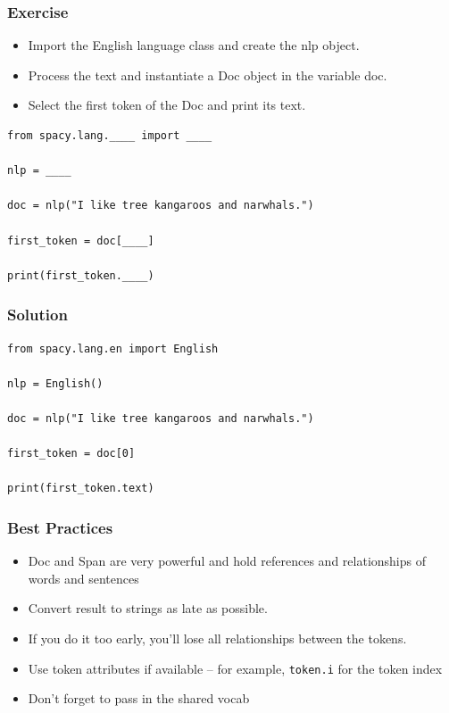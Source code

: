 \begin{frame}[fragile]\frametitle{Exercise}

  \begin{itemize}
    \item Import the English language class and create the nlp object.
    \item Process the text and instantiate a Doc object in the variable doc.
    \item Select the first token of the Doc and print its text.
  \end{itemize}

  \begin{lstlisting}
from spacy.lang.____ import ____

nlp = ____

doc = nlp("I like tree kangaroos and narwhals.")

first_token = doc[____]

print(first_token.____)
  \end{lstlisting}

\end{frame}

\begin{frame}[fragile]\frametitle{Solution}

  \begin{lstlisting}
from spacy.lang.en import English

nlp = English()

doc = nlp("I like tree kangaroos and narwhals.")

first_token = doc[0]

print(first_token.text)
  \end{lstlisting}

\end{frame}

\begin{frame}[fragile]\frametitle{Best Practices}

  \begin{itemize}
    \item Doc and Span are very powerful and hold references and relationships of words and sentences
    \item Convert result to strings as late as possible. 
		\item If you do it too early, you'll lose all relationships between the tokens.
    \item Use token attributes if available – for example, \lstinline|token.i|  for the token index
    \item Don't forget to pass in the shared vocab
  \end{itemize}

\end{frame}


